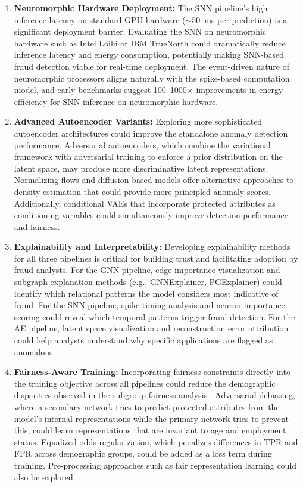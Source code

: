 \begin{enumerate}[label=\arabic*.]
\item \textbf{Neuromorphic Hardware Deployment:} The SNN pipeline's high inference latency on standard GPU hardware ($\sim$50~ms per prediction) is a significant deployment barrier. Evaluating the SNN on neuromorphic hardware such as Intel Loihi or IBM TrueNorth could dramatically reduce inference latency and energy consumption, potentially making SNN-based fraud detection viable for real-time deployment. The event-driven nature of neuromorphic processors aligns naturally with the spike-based computation model, and early benchmarks suggest 100--1000$\times$ improvements in energy efficiency for SNN inference on neuromorphic hardware.

\item \textbf{Advanced Autoencoder Variants:} Exploring more sophisticated autoencoder architectures could improve the standalone anomaly detection performance. Adversarial autoencoders, which combine the variational framework with adversarial training to enforce a prior distribution on the latent space, may produce more discriminative latent representations. Normalizing flows and diffusion-based models offer alternative approaches to density estimation that could provide more principled anomaly scores. Additionally, conditional VAEs that incorporate protected attributes as conditioning variables could simultaneously improve detection performance and fairness.

\item \textbf{Explainability and Interpretability:} Developing explainability methods for all three pipelines is critical for building trust and facilitating adoption by fraud analysts. For the GNN pipeline, edge importance visualization and subgraph explanation methods (e.g., GNNExplainer, PGExplainer) could identify which relational patterns the model considers most indicative of fraud. For the SNN pipeline, spike timing analysis and neuron importance scoring could reveal which temporal patterns trigger fraud detection. For the AE pipeline, latent space visualization and reconstruction error attribution could help analysts understand why specific applications are flagged as anomalous.

\item \textbf{Fairness-Aware Training:} Incorporating fairness constraints directly into the training objective across all pipelines could reduce the demographic disparities observed in the subgroup fairness analysis \cite{kozodoi2022fairness}. Adversarial debiasing, where a secondary network tries to predict protected attributes from the model's internal representations while the primary network tries to prevent this, could learn representations that are invariant to age and employment status. Equalized odds regularization, which penalizes differences in TPR and FPR across demographic groups, could be added as a loss term during training. Pre-processing approaches such as fair representation learning could also be explored.


\end{enumerate}

